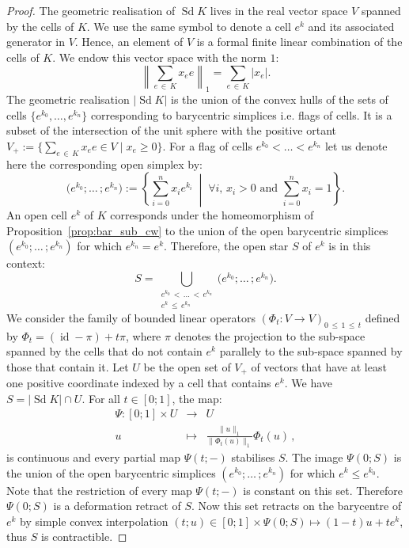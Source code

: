 \documentclass[AHL,Unicode,longabstracts,published]{cedram}
\DeclareMathOperator{\Sd}{Sd}
\DeclareMathOperator{\id}{id}
\let\oldforall\forall
\renewcommand*{\forall}{\mathrel{\oldforall}}
\begin{document}
\begin{proof}
The geometric realisation of $\Sd K$ lives in the real vector space $V$ spanned by the cells of $K$. We use the same symbol to denote a cell $e^k$ and its associated generator in $V$. Hence, an element of $V$ is a formal finite linear combination of the cells of $K$. We endow this vector space with the norm $1$:
\begin{equation*}
\left\|\sum_{e\,\in\,K} x_ee\right\|_1=\sum_{e\,\in\,K}|x_e|.
\end{equation*}
The geometric realisation $|\Sd K|$ is the union of the convex hulls of the sets of cells $\{e^{k_0},\dots,e^{k_n}\}$ corresponding to barycentric simplices i.e. flags of cells. It is a subset of the intersection of the unit sphere with the positive ortant $V_+:=\{\sum_{e\,\in \,K}x_ee\in V\;|\;x_e\geq 0\}$. For a flag of cells $e^{k_0}<\dots<e^{k_n}$ let us denote here the corresponding open simplex by:
\begin{equation*}
\big(e^{k_0};\dots\,;e^{k_n}\big):=\left\{\sum_{i=0}^n x_ie^{k_i}\;\middle|\;\forall i,\, x_i>0\text{ and }\sum_{i=0}^n x_i=1\right\}.
\end{equation*}
An open cell $e^k$ of $K$ corresponds under the homeomorphism of Proposition~\ref{prop:bar_sub_cw} to the union of the open barycentric simplices $(e^{k_0};\dots\,;e^{k_n})$ for which $e^{k_n}=e^k$. Therefore, the open star $S$ of $e^k$ is in this context:
\begin{equation*}
S=\bigcup_{\substack{e^{k_0}\,<\,\dots\,<\,e^{k_n}\\e^k\,\leq\,e^{k_n}}}\big(e^{k_0};\dots\,;e^{k_n}\big).
\end{equation*}
We consider the family of bounded linear operators $(\Phi_t:V\rightarrow V)_{0\,\leq\,1\,\leq\,t}$ defined by $\Phi_t=(\id-\pi)+t\pi$, where $\pi$ denotes the projection to the sub-space spanned by the cells that do not contain $e^k$ parallely to the sub-space spanned by those that contain it. Let $U$ be the open set of $V_+$ of vectors that have at least one positive coordinate indexed by a cell that contains $e^k$. We have $S=|\Sd K|\cap U$. For all $t\in[0;1]$, the map:
\begin{equation*}
\begin{array}{rcl}
\Psi:[0;1]\times U& \longrightarrow & U \\%
u & \longmapsto & \frac{\|u\|_1}{\|\Phi_t(u)\|_1}\Phi_t(u)\,,
\end{array}
\end{equation*}
is continuous and every partial map $\Psi(t;-)$ stabilises $S$. The image $\Psi(0;S)$ is the union of the open barycentric simplices $(e^{k_0};\dots\,;e^{k_n})$ for which $e^k\leq e^{k_0}$. Note that the restriction of every map $\Psi(t;-)$ is constant on this set. Therefore $\Psi(0;S)$ is a deformation retract of $S$. Now this set retracts on the barycentre of $e^k$ by simple convex interpolation $(t;u)\in [0;1]\times\Psi(0;S)\mapsto (1-t)u+te^k$, thus $S$ is contractible.
\end{proof}
\end{document}
